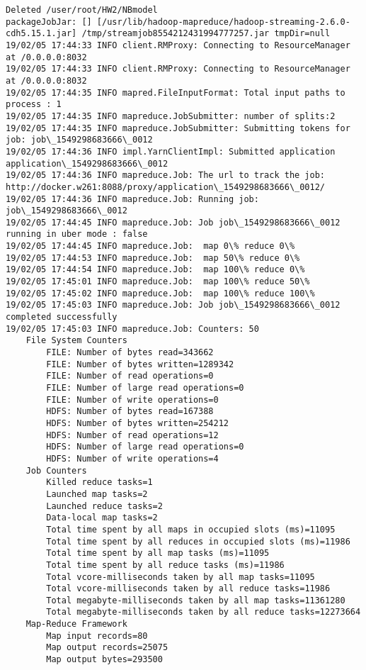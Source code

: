\documentclass[11pt]{article}
\begin{document}
    \begin{Verbatim}[commandchars=\\\{\}]
Deleted /user/root/HW2/NBmodel
packageJobJar: [] [/usr/lib/hadoop-mapreduce/hadoop-streaming-2.6.0-cdh5.15.1.jar] /tmp/streamjob8554212431994777257.jar tmpDir=null
19/02/05 17:44:33 INFO client.RMProxy: Connecting to ResourceManager at /0.0.0.0:8032
19/02/05 17:44:33 INFO client.RMProxy: Connecting to ResourceManager at /0.0.0.0:8032
19/02/05 17:44:35 INFO mapred.FileInputFormat: Total input paths to process : 1
19/02/05 17:44:35 INFO mapreduce.JobSubmitter: number of splits:2
19/02/05 17:44:35 INFO mapreduce.JobSubmitter: Submitting tokens for job: job\_1549298683666\_0012
19/02/05 17:44:36 INFO impl.YarnClientImpl: Submitted application application\_1549298683666\_0012
19/02/05 17:44:36 INFO mapreduce.Job: The url to track the job: http://docker.w261:8088/proxy/application\_1549298683666\_0012/
19/02/05 17:44:36 INFO mapreduce.Job: Running job: job\_1549298683666\_0012
19/02/05 17:44:45 INFO mapreduce.Job: Job job\_1549298683666\_0012 running in uber mode : false
19/02/05 17:44:45 INFO mapreduce.Job:  map 0\% reduce 0\%
19/02/05 17:44:53 INFO mapreduce.Job:  map 50\% reduce 0\%
19/02/05 17:44:54 INFO mapreduce.Job:  map 100\% reduce 0\%
19/02/05 17:45:01 INFO mapreduce.Job:  map 100\% reduce 50\%
19/02/05 17:45:02 INFO mapreduce.Job:  map 100\% reduce 100\%
19/02/05 17:45:03 INFO mapreduce.Job: Job job\_1549298683666\_0012 completed successfully
19/02/05 17:45:03 INFO mapreduce.Job: Counters: 50
	File System Counters
		FILE: Number of bytes read=343662
		FILE: Number of bytes written=1289342
		FILE: Number of read operations=0
		FILE: Number of large read operations=0
		FILE: Number of write operations=0
		HDFS: Number of bytes read=167388
		HDFS: Number of bytes written=254212
		HDFS: Number of read operations=12
		HDFS: Number of large read operations=0
		HDFS: Number of write operations=4
	Job Counters 
		Killed reduce tasks=1
		Launched map tasks=2
		Launched reduce tasks=2
		Data-local map tasks=2
		Total time spent by all maps in occupied slots (ms)=11095
		Total time spent by all reduces in occupied slots (ms)=11986
		Total time spent by all map tasks (ms)=11095
		Total time spent by all reduce tasks (ms)=11986
		Total vcore-milliseconds taken by all map tasks=11095
		Total vcore-milliseconds taken by all reduce tasks=11986
		Total megabyte-milliseconds taken by all map tasks=11361280
		Total megabyte-milliseconds taken by all reduce tasks=12273664
	Map-Reduce Framework
		Map input records=80
		Map output records=25075
		Map output bytes=293500

\end{Verbatim}
\end{document}
